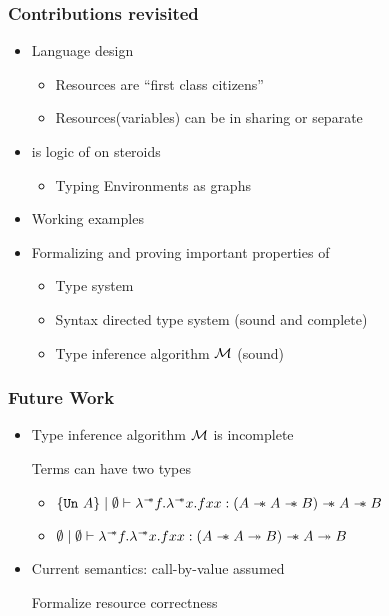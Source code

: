 \begin{frame}
  \frametitle{Contributions revisited}

  \begin{itemize}

  \item {\color{red}Language design}
    \begin{itemize}
    \item {\color{red}Resources are ``first class citizens''}
    \item {\color{red}Resources(variables) can be in sharing or separate}
    \end{itemize}

  \item {\color{red}\qub{} is logic of \BI on steroids}
    \begin{itemize}
    \item {\color{red}Typing Environments as graphs}
    \end{itemize}
  \item {\color{red}Working examples}
  \item Formalizing and proving important properties of \qub{}
    \begin{itemize}
    \item Type system
    \item Syntax directed type system (sound and complete)
    \item Type inference algorithm $\mathcal{M}$ (sound)
    \end{itemize}

  \end{itemize}

\end{frame}

\begin{frame}[fragile, c]
  \frametitle{Future Work}
  \begin{itemize}
  \item Type inference algorithm $\mathcal{M}{}$ is incomplete

    Terms can have two types
    \begin{itemize}
    \item $\{\texttt{Un}\ A\} \mid \emptyset \vdash \lambda^{\sepimp}f. \lambda^{\sepimp}x. f x x: (A \sepimp A \sepimp B) \sepimp A \sepimp B$
    \item $\emptyset \mid \emptyset \vdash \lambda^{\mathrel{-\mkern-6mu*}}f. \lambda^{\mathrel{-\mkern-6mu*}}x. f x x: (A \mathrel{-\mkern-6mu*} A \twoheadrightarrow B) \mathrel{-\mkern-6mu*} A \twoheadrightarrow B$
    \end{itemize}
  \item Current semantics: call-by-value assumed

    Formalize resource correctness
  \end{itemize}
\end{frame}



